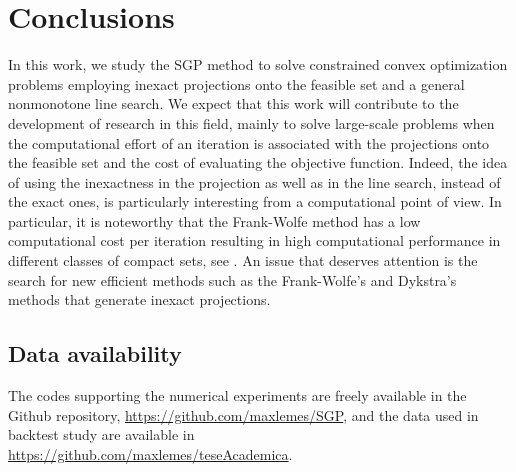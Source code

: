 

\chapter{Conclusions} \label{chap:Conclusions}
\thispagestyle{empty}

In this work, we study the SGP method  to solve   constrained convex optimization problems employing  inexact projections onto the feasible set and a general nonmonotone  line search. We expect that this work will contribute to the development of research in this field, mainly to solve large-scale problems when the computational effort of an iteration is associated with the projections onto the feasible set and  the cost of evaluating the objective function. Indeed, the idea of using the inexactness in the projection as well as in the line search,   instead of the exact ones, is particularly interesting from a computational point of view. In particular,   it is noteworthy that the Frank-Wolfe method  has a low computational cost per iteration  resulting in high computational performance in different classes of compact sets, see \cite{GarberHazan2015, Jaggi2013}.  An issue that deserves attention is the search for new efficient methods such as the Frank-Wolfe's and Dykstra's  methods that generate inexact projections.


\section*{Data availability} 
The codes supporting the numerical experiments are freely available in the Github repository, \url{https://github.com/maxlemes/SGP}, and the data used in backtest study are available in \\ \url{https://github.com/maxlemes/teseAcademica}.